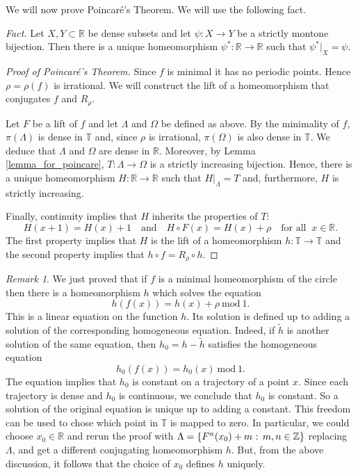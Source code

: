 \documentclass[12pt]{article}
\theoremstyle{definition}
\theoremstyle{remark}
\newtheorem{remark}[theorem]{Remark}
\begin{document}
We will now prove Poincar\'e's Theorem. We will use the following fact.

\medskip
\noindent
{\it Fact.} Let $X,Y \subset \mathbb R$ be dense subsets and let $\psi: X \to Y$ be a strictly 
montone bijection. Then there is a unique homeomorphism
$\psi^* : \mathbb R \to \mathbb R$ such that $\psi^*|_X=\psi$.

\smallskip

\begin{proof}[Proof of Poincar\'e's Theorem]
Since $f$ is minimal it has no periodic points. Hence $\rho = \rho(f)$ is irrational.
We will construct the lift of a homeomorphism that conjugates $f$ and $R_\rho$.

Let $F$ be a lift of $f$ and let $\Lambda$ and $\Omega$ be defined as above.
By the minimality of $f$, $\pi(\Lambda)$ is dense in $\mathbb T$ and, since $\rho$ is irrational,
$\pi(\Omega)$ is also dense in $\mathbb T$. We deduce that $\Lambda$ and $\Omega$ are dense in $\mathbb R$.
Moreover, by Lemma \ref{lemma_for_poincare}, $T : \Lambda \to \Omega$ is a strictly increasing
bijection.
Hence, there is a unique homeomorphism $H : \mathbb R \to \mathbb R$ such that $H|_\Lambda =T$
and, furthermore, $H$ is strictly increasing.

Finally, continuity implies that $H$ inherits the properties of $T$:
\[
H(x+1) = H(x)+1 \quad \text{and} \quad 
H \circ F(x) = H(x) + \rho
\quad \text{for all } \ x \in \mathbb R.
\]
The first property implies that $H$ is the lift of a homeomorphism $h : \mathbb T\to \mathbb T$ and the second property implies that $h \circ f = R_\rho \circ h$.
\end{proof}


\begin{remark}
We just proved that if $f$ is a minimal homeomorphism of the circle then there
is a homeomorphism $h$ which solves the equation
\[
h(f(x)) = h(x) + \rho \ \text{mod} \ 1.
\]
This is a linear equation on the function $h$. Its solution is defined up to
adding a solution of the corresponding homogeneous equation. Indeed, if
$\tilde h$
is another solution of the same equation, then $h_0 = h - \tilde h$ satisfies the
homogeneous equation
\[
h_0(f(x)) = h_0(x) \ \text{mod} \ 1.
\]
The equation implies that $h_0$ is constant on a trajectory of a point $x$. Since each
trajectory is dense and $h_0$ is continuous, we conclude that $h_0$ is constant.
So a solution of the original equation is unique up to adding a constant.
This freedom can be used to chose which point in $\mathbb T$ is mapped to zero.
In particular, we could choose $x_0 \in \mathbb R$ and rerun the proof with 
$\Lambda= \{F^n(x_0) +m \hbox{ : } m,n \in \mathbb Z\}$ replacing $\Lambda$, and get a different 
conjugating homeomorphism $h$. But, from the above discussion,
it follows that the choice of $x_0$ defines $h$ uniquely.
\end{remark}
\end{document}
